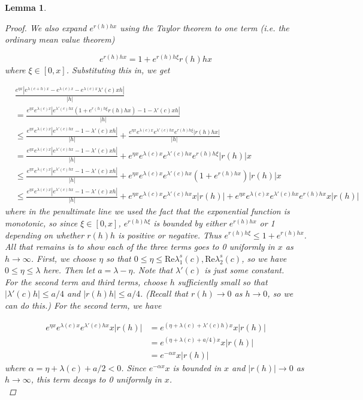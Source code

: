\documentclass[12pt]{article}
\newtheorem{lemma}{Lemma}
\begin{document}
\begin{lemma}
\begin{proof}
We also expand $e^{r(h)h x}$ using the Taylor theorem to one term (i.e. the ordinary mean value theorem)

\[
e^{r(h)h x} = 1 + e^{r(h)h\xi}r(h)hx
\]
where $\xi \in [0, x]$. Substituting this in, we get

\begin{align*}
&\frac{e^{\eta x}| e^{\lambda(c+h) x} - e^{\lambda(c) x} - e^{\lambda(c) x} \lambda'(c)x h|}{|h|}\\
&= \frac{e^{\eta x} e^{\lambda(c)x}| e^{\lambda'(c)hx}( 1 + e^{r(h)h\xi}r(h)hx )- 1 - \lambda'(c)x h|}{|h|} \\
&\leq \frac{e^{\eta x} e^{\lambda(c)x}| e^{\lambda'(c)hx} - 1 - \lambda'(c)x h|}{|h|} + \frac{e^{\eta x} e^{\lambda(c)x} e^{\lambda'(c)hx} e^{r(h)h\xi} | r(h)h x|}{|h|} \\
&= \frac{e^{\eta x} e^{\lambda(c)x}| e^{\lambda'(c)hx} - 1 - \lambda'(c)x h|}{|h|} + e^{\eta x} e^{\lambda(c)x} e^{\lambda'(c)hx} e^{r(h)h\xi}| r(h)| x \\
&\leq \frac{e^{\eta x} e^{\lambda(c)x}| e^{\lambda'(c)hx} - 1 - \lambda'(c)x h|}{|h|} + e^{\eta x} e^{\lambda(c)x} e^{\lambda'(c)hx} (1 + e^{r(h)h x}) | r(h)| x  \\
&\leq \frac{e^{\eta x} e^{\lambda(c)x}| e^{\lambda'(c)hx} - 1 - \lambda'(c)x h|}{|h|} + e^{\eta x} e^{\lambda(c)x} e^{\lambda'(c)hx} x | r(h)| + e^{\eta x} e^{\lambda(c)x} e^{\lambda'(c)hx} e^{r(h)h x} x | r(h) |
\end{align*}
where in the penultimate line we used the fact that the exponential function is monotonic, so since $\xi \in [0, x]$, $e^{r(h)h\xi}$ is bounded by either $e^{r(h)h x}$ or 1 depending on whether $r(h)h$ is positive or negative. Thus $e^{r(h)h\xi} \leq 1 + e^{r(h)h x}$.\\

All that remains is to show each of the three terms goes to 0 uniformly in $x$ as $h \rightarrow \infty$. First, we choose $\eta$ so that $0 \leq \eta \leq \text{Re} \lambda_1^s(c), \text{Re} \lambda_2^s(c)$, so we have $0 \leq \eta \leq \lambda$ here. Then let $a = \lambda - \eta$. Note that $\lambda'(c)$ is just some constant.\\

For the second term and third terms, choose $h$ sufficiently small so that $|\lambda'(c) h| \leq a/4$ and  $|r(h)h| \leq a/4$. (Recall that $r(h) \rightarrow 0 $ as $h \rightarrow 0$, so we can do this.) For the second term, we have

\begin{align*}
e^{\eta x} e^{\lambda(c)x} e^{\lambda'(c)hx} x | r(h)| &= e^{(\eta + \lambda(c) + \lambda'(c)h)x}x|r(h)| \\
&= e^{(\eta + \lambda(c) + a/4 )x}x|r(h)| \\
&= e^{-\alpha x}x|r(h)|
\end{align*}
where $\alpha = \eta + \lambda(c) + a/2  < 0$. Since $e^{-\alpha x}x$ is bounded in $x$ and $|r(h)| \rightarrow 0$ as $h \rightarrow \infty$, this term decays to 0 uniformly in $x$.\\


\end{proof}
\end{lemma}
\end{document}
